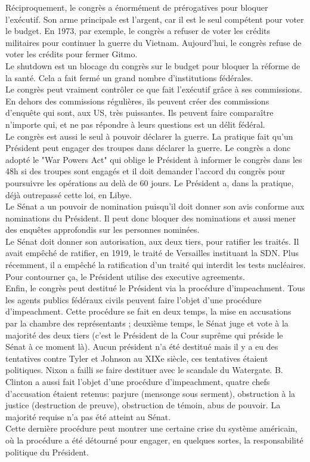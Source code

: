 \documentclass[10pt, a4paper, openany]{book}
\begin{document}
Réciproquement, le congrès a énormément de prérogatives pour bloquer l'exécutif. Son arme principale est l'argent, car il est le seul compétent pour voter le budget. En 1973, par exemple, le congrès a refuser de voter les crédits militaires pour continuer la guerre du Vietnam. Aujourd'hui, le congrès refuse de voter les crédits pour fermer Gitmo. \\
Le shutdown est un blocage du congrès sur le budget pour bloquer la réforme de la santé. Cela a fait fermé un grand nombre d'institutions fédérales. \\
Le congrès peut vraiment contrôler ce que fait l'exécutif grâce à ses commissions. En dehors des commissions régulières, ils peuvent créer des commissions d'enquête qui sont, aux US, très puissantes. Ils peuvent faire comparaître n'importe qui, et ne pas répondre à leurs questions est un délit fédéral. \\
Le congrès est aussi le seul à pouvoir déclarer la guerre. La pratique fait qu'un Président peut engager des troupes dans déclarer la guerre. Le congrès a donc adopté le "War Powers Act" qui oblige le Président à informer le congrès dans les 48h si des troupes sont engagés et il doit demander l'accord du congrès pour poursuivre les opérations au delà de 60 jours. Le Président a, dans la pratique, déjà outrepassé cette loi, en Libye. \\
Le Sénat a un pouvoir de nomination puisqu'il doit donner son avis conforme aux nominations du Président. Il peut donc bloquer des nominations et aussi mener des enquêtes approfondis sur les personnes nominées. \\
Le Sénat doit donner son autorisation, aux deux tiers, pour ratifier les traités. Il avait empêché de ratifier, en 1919, le traité de Versailles instituant la SDN. Plus récemment, il a empêché la ratification d'un traité qui interdit les tests nucléaires. Pour contourner ça, le Président utilise des executive agreements. \\
Enfin, le congrès peut destitué le Président via la procédure d'impeachment. Tous les agents publics fédéraux civils peuvent faire l'objet d'une procédure d'impeachment. Cette procédure se fait en deux temps, la mise en accusations par la chambre des représentants ; deuxième temps, le Sénat juge et vote à la majorité des deux tiers (c'est le Président de la Cour suprême qui préside le Sénat à ce moment là). Aucun président n'a été destitué mais il y a eu des tentatives contre Tyler et Johnson au XIXe siècle, ces tentatives étaient politiques. Nixon a failli se faire destituer avec le scandale du Watergate. B. Clinton a aussi fait l'objet d'une procédure d'impeachment, quatre chefs d'accusation étaient retenus: parjure (mensonge sous serment), obstruction à la justice (destruction de preuve), obstruction de témoin, abus de pouvoir. La majorité requise n'a pas été atteint au Sénat. \\
Cette dernière procédure peut montrer une certaine crise du système américain, où la procédure a été détourné pour engager, en quelques sortes, la responsabilité politique du Président. 
\end{document}
